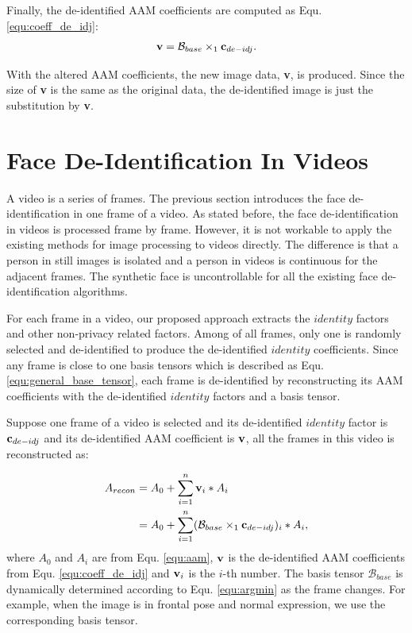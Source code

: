 	Finally, the de-identified AAM coefficients are computed as Equ. \ref{equ:coeff_de_idj}: 
	\begin{align}
		\label{equ:coeff_de_idj}
		\begin{split}
			{\bf v} = \mathcal{B}_{base} \times_1 {\bf c}_{de-idj}.
		\end{split}
	\end{align}

	With the altered AAM coefficients, the new image data, {\bf v}, is produced.
	Since the size of {\bf v} is the same as the original data, the de-identified
	image is just the substitution by {\bf v}.  


	\section{Face De-Identification In Videos}
	\label{sec:video}

	A video is a series of frames. The previous section introduces the face de-identification in one frame
	of a video. As stated before, the face de-identification in videos is processed frame by frame. 
	However, it is not workable to apply the existing methods for image processing to videos directly.
	The difference is that a person in still images is isolated and a person in videos is continuous for
	the adjacent frames. The synthetic face is uncontrollable for all the existing face de-identification
	algorithms. 

	For each frame in a video, our proposed approach extracts the $identity$ factors and other non-privacy
	related factors. Among of all frames, only one is randomly selected and de-identified to produce the
	de-identified $identity$ coefficients. 
	Since any frame is close to one basis tensors which is described as Equ. \ref{equ:general_base_tensor},
	each frame is de-identified by reconstructing its AAM coefficients with the de-identified
	$identity$ factors and a basis tensor. 

	Suppose one frame of a video is selected and its de-identified $identity$ factor is ${\bf c}_{de-idj}$ and 
	its de-identified AAM coefficient is ${\bf v}$, all the frames in this video is reconstructed as:

	\begin{align}
		\label{equ:recon_frame}
		\begin{split}
			A_{recon} &= A_0 + \sum_{i=1}^{n}{\bf v}_i*A_i \\
						&= A_0 + \sum_{i=1}^{n}(\mathcal{B}_{base} \times_1 {\bf c}_{de-idj})_i*A_i,
		\end{split}
	\end{align}
	where $A_0$ and $A_i$ are from Equ. \ref{equ:aam}, ${\bf v}$ is the de-identified AAM coefficients from Equ. 
	\ref{equ:coeff_de_idj} and ${\bf v}_i$ is the $i$-th number. The basis tensor $\mathcal{B}_{base}$ is dynamically
	determined according to Equ. \ref{equ:argmin} as the frame changes. For example,
	when the image is in frontal pose and normal expression, we use the corresponding
	basis tensor. 
	
